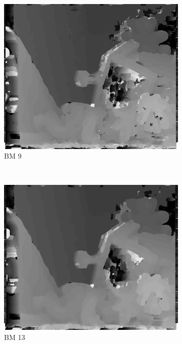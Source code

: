 \begin{figure}
  \begin{subfigure}[b]{0.23\textwidth}
    \centering
    \includegraphics[width=\textwidth]{images/stereo-pairs/teddy_bm_9.png}
    \caption{BM 9}
  \end{subfigure}
  ~
  \begin{subfigure}[b]{0.23\textwidth}
    \centering
    \includegraphics[width=\textwidth]{images/stereo-pairs/teddy_bm_13.png}
    \caption{BM 13}
  \end{subfigure}
  ~
  \begin{subfigure}[b]{0.23\textwidth}

\end{subfigure}
\end{figure}
